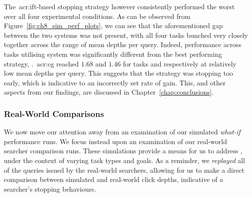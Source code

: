 The~\gls{acr:ift}-based stopping strategy  however consistently performed the worst over all four experimental conditions. As can be observed from Figure~\ref{fig:ch8_sim_perf_plots}, we can see that the aforementioned gap between the two systems was not present, with all four tasks bunched very closely together across the range of mean depths per query. Indeed, performance across tasks utilising system  was significantly different from the best performing strategy, .~\gls{acr:cg} reached $1.68$ and $1.46$ for tasks  and  respectively at relatively low mean depths per query. This suggests that the strategy was stopping too early, which is indicative to an incorrectly set rate of gain. This, and other aspects from our findings, are discussed in Chapter~\ref{chap:conclusions}.

\subsubsection{Real-World Comparisons}\label{sec:diversity:simulated:results:comparisons}
We now move our attention away from an examination of our simulated \emph{what-if} performance runs. We focus instead upon an examination of our real-world searcher comparison runs. These simulations provide a means for us to address , under the context of varying task types and goals. As a reminder, we \emph{replayed} all of the queries issued by the real-world searchers, allowing for us to make a direct comparison between simulated and real-world click depths, indicative of a searcher's stopping behaviours.

